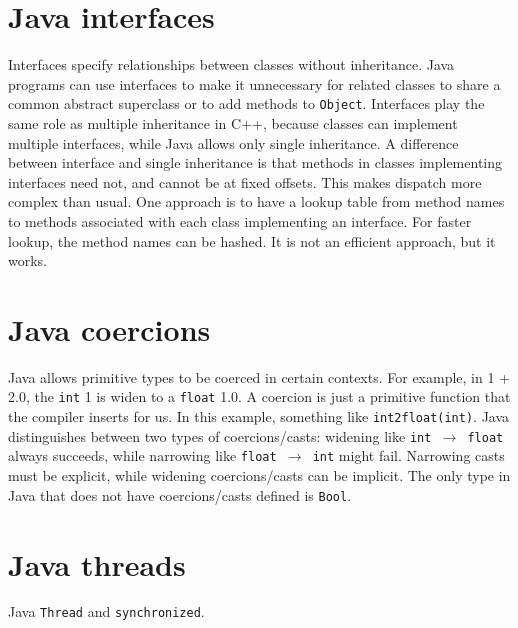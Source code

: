 \section{Java interfaces}
Interfaces specify relationships between classes without inheritance. Java programs can use interfaces to make it unnecessary for related classes to share a common abstract superclass or to add methods to \texttt{Object}. Interfaces play the same role as multiple inheritance in C++, because classes can implement multiple interfaces, while Java allows only single inheritance. A difference between interface and single inheritance is that methods in classes implementing interfaces need not, and cannot be at fixed offsets. This makes dispatch more complex than usual. One approach is to have a lookup table from method names to methods associated with each class implementing an interface. For faster lookup, the method names can be hashed. It is not an efficient approach, but it works. 
\section{Java coercions}
Java allows primitive types to be coerced in certain contexts. For example, in 1 + 2.0, the \texttt{int} 1 is widen to a \texttt{float} 1.0. A coercion is just a primitive function that the compiler inserts for us. In this example, something like \texttt{int2float(int)}. Java distinguishes between two types of coercions/casts: widening like \texttt{int $\rightarrow$ float} always succeeds, while narrowing like \texttt{float $\rightarrow$ int} might fail. Narrowing casts must be explicit, while widening coercions/casts can be implicit. The only type in Java that does not have coercions/casts defined is \texttt{Bool}.
\section{Java threads}
Java \texttt{Thread} and \texttt{synchronized}. 
\ifx\PREAMBLE\undefined

\fi